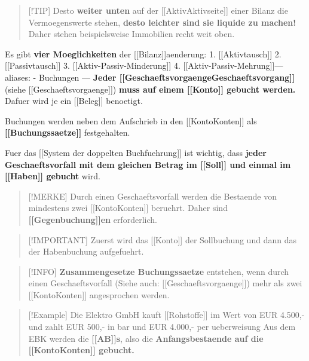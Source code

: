 \begin{quote}
{[}!TIP{]} Desto \textbf{weiter unten} auf der
{[}{[}Aktiv\textbar Aktivseite{]}{]} einer Bilanz die Vermoegenswerte
stehen, \textbf{desto leichter sind sie liquide zu machen!} Daher stehen
beispielsweise Immobilien recht weit oben.
\end{quote}

Es gibt \textbf{vier Moeglichkeiten} der {[}{[}Bilanz{]}{]}aenderung: 1.
{[}{[}Aktivtausch{]}{]} 2. {[}{[}Passivtausch{]}{]} 3.
{[}{[}Aktiv-Passiv-Minderung{]}{]} 4.
{[}{[}Aktiv-Passiv-Mehrung{]}{]}--- aliases: - Buchungen ---
\textbf{Jeder {[}{[}Geschaeftsvorgaenge\textbar Geschaeftsvorgang{]}{]}}
(siehe {[}{[}Geschaeftsvorgaenge{]}{]}) \textbf{muss auf einem
{[}{[}Konto{]}{]} gebucht werden.} Dafuer wird je ein {[}{[}Beleg{]}{]}
benoetigt.

Buchungen werden neben dem Aufschrieb in den
{[}{[}Konto\textbar Konten{]}{]} als \textbf{{[}{[}Buchungssaetze{]}{]}}
festgehalten.

Fuer das {[}{[}System der doppelten Buchfuehrung{]}{]} ist wichtig, dass
\textbf{jeder Geschaeftsvorfall mit dem gleichen Betrag im
{[}{[}Soll{]}{]} und einmal im {[}{[}Haben{]}{]} gebucht} wird.

\begin{quote}
{[}!MERKE{]} Durch einen Geschaeftsvorfall werden die Bestaende von
mindestens zwei {[}{[}Konto\textbar Konten{]}{]} beruehrt. Daher sind
\textbf{{[}{[}Gegenbuchung{]}{]}en} erforderlich.
\end{quote}

\begin{quote}
{[}!IMPORTANT{]} Zuerst wird das {[}{[}Konto{]}{]} der Sollbuchung und
dann das der Habenbuchung aufgefuehrt.
\end{quote}

\begin{quote}
{[}!INFO{]} \textbf{Zusammengesetze Buchungssaetze} entstehen, wenn durch
einen Geschaeftsvorfall (Siehe auch: {[}{[}Geschaeftsvorgaenge{]}{]}) mehr
als zwei {[}{[}Konto\textbar Konten{]}{]} angesprochen werden.
\end{quote}

\begin{quote}
{[}!Example{]} Die Elektro GmbH kauft {[}{[}Rohstoffe{]}{]} im Wert von
EUR 4.500,- und zahlt EUR 500,- in bar und EUR 4.000,- per ueberweisung
Aus dem EBK werden die \textbf{{[}{[}AB{]}{]}s}, also die
\textbf{Anfangsbestaende auf die {[}{[}Konto\textbar Konten{]}{]}
gebucht.}
\end{quote}

